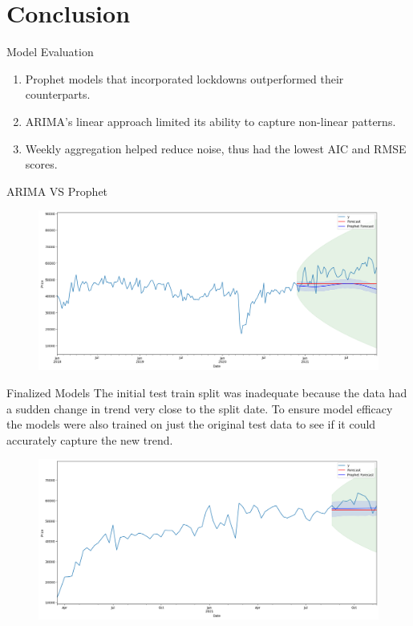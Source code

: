 \documentclass[9pt, dvipsnames]{beamer}
\begin{document}
\section{Conclusion}
    \begin{frame}{Model Evaluation}
        \begin{enumerate}
            \item Prophet models that incorporated lockdowns outperformed their counterparts. \pause
            \item ARIMA’s linear approach limited its ability to capture non-linear patterns. \pause
            \item Weekly aggregation helped reduce noise, thus had the lowest AIC and RMSE scores.
        \end{enumerate}
    \end{frame}
    \begin{frame}{ARIMA VS Prophet}
        \begin{figure}
            \centering
            \includegraphics[height=0.47\paperheight]{assets/Model-Comparison.png}
            \label{fig:Model-Comparison}
        \end{figure}
    \end{frame}
    \begin{frame}{Finalized Models}
        The initial test train split was inadequate because the data had a sudden change in trend very close to
        the split date. To ensure model efficacy the models were also trained on just the original test data to 
        see if it could accurately capture the new trend.
        \begin{figure}
            \centering
            \includegraphics[height=0.47\paperheight]{assets/Model-Comparison-Split.png}
            \label{fig:Model-Comparison-Split}
        \end{figure}
    \end{frame}
\end{document}
